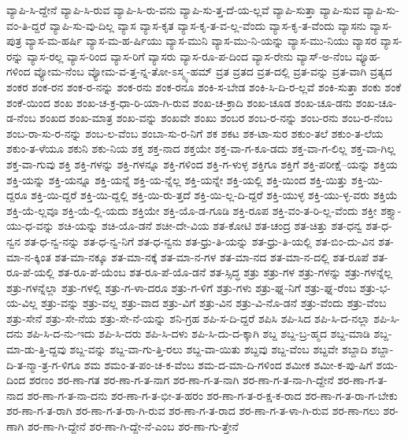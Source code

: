 {ವ್ಯಾಪಿ-ಸಿ-ದ್ದೇನೆ
ವ್ಯಾಪಿ-ಸಿ-ರುವ
ವ್ಯಾಪಿ-ಸಿ-ರು-ವನು
ವ್ಯಾಪಿ-ಸು-ತ್ತ-ದೆ-ಯ-ಲ್ಲವೆ
ವ್ಯಾಪಿ-ಸುತ್ತಾ
ವ್ಯಾಪಿ-ಸುವ
ವ್ಯಾಪಿ-ಸು-ವಂ-ತಿ-ದ್ದರೆ
ವ್ಯಾಪಿ-ಸು-ವು-ದಿಲ್ಲ
ವ್ಯಾಸ
ವ್ಯಾಸ-ಕೃತ
ವ್ಯಾಸ-ಕೃ-ತ-ವ-ಲ್ಲ-ವೆಂದು
ವ್ಯಾಸ-ಕೃ-ತ-ವೆಂದು
ವ್ಯಾಸನು
ವ್ಯಾಸ-ಪುತ್ರ
ವ್ಯಾಸ-ಮ-ಹರ್ಷಿ
ವ್ಯಾಸ-ಮ-ಹ-ರ್ಷಿಯು
ವ್ಯಾಸ-ಮುನಿ
ವ್ಯಾಸ-ಮು-ನಿ-ಯನ್ನು
ವ್ಯಾಸ-ಮು-ನಿಯು
ವ್ಯಾಸರ
ವ್ಯಾಸ-ರನ್ನು
ವ್ಯಾಸ-ರಲ್ಲ
ವ್ಯಾಸ-ರಿಂದ
ವ್ಯಾಸ-ರಿಗೆ
ವ್ಯಾಸರು
ವ್ಯಾಸ-ರೂ-ಪ-ದಿಂದ
ವ್ಯಾಸ-ರೇನು
ವ್ಯಾಸ್-ಅ-ನೆಂಬ
ವ್ಯೂಹ-ಗಳಿಂದ
ವ್ಯೋಮ-ನೆಂಬ
ವ್ಯೋಮ-ವ-ತ್ತ-ನ್ನ-ತೋ-ಽಸ್ಮ್ಯ-ಹಮ್
ವ್ರತ
ವ್ರತದ
ವ್ರತ-ದಲ್ಲಿ
ವ್ರತ-ವನ್ನು
ವ್ರತ-ವಾಗಿ
ವ್ರತ್ಯದ
ಶಂಕರ
ಶಂಕ-ರನ
ಶಂಕ-ರ-ನನ್ನು
ಶಂಕ-ರನು
ಶಂಕ-ರನೂ
ಶಂಕಿ-ಸ-ಬೇಡ
ಶಂಕಿ-ಸಿ-ದಿ-ರ-ಲ್ಲವೆ
ಶಂಕಿ-ಸುತ್ತಾ
ಶಂಕು
ಶಂಕೆ
ಶಂಕೆ-ಯಿಂದ
ಶಂಖ
ಶಂಖ-ಚ-ಕ್ರ-ಧಾ-ರಿ-ಯಾ-ಗಿ-ರುವ
ಶಂಖ-ಚ-ಕ್ರಾದಿ
ಶಂಖ-ಚೂಡ
ಶಂಖ-ಚೂ-ಡನು
ಶಂಖ-ಚೂ-ಡ-ನೆಂಬ
ಶಂಖದ
ಶಂಖ-ಮಾತ್ರ
ಶಂಖ-ವನ್ನು
ಶಂಖವೇ
ಶಂಖು
ಶಂಬರ
ಶಂಬ-ರ-ನನ್ನು
ಶಂಬ-ರನು
ಶಂಬ-ರ-ನೆಂಬ
ಶಂಬ-ರಾ-ಸು-ರ-ನನ್ನು
ಶಂಬ-ಲ-ವೆಂಬ
ಶಂಬಾ-ಸು-ರ-ನಿಗೆ
ಶಕ
ಶಕಟ
ಶಕ-ಟಾ-ಸುರ
ಶಕುಂ-ತಲೆ
ಶಕುಂ-ತ-ಲೆಯ
ಶಕುಂ-ತ-ಳೆಯೂ
ಶಕುನಿ
ಶಕು-ನಿಯ
ಶಕ್ತ
ಶಕ್ತ-ನಾದ
ಶಕ್ತಯೇ
ಶಕ್ತ-ವಾ-ಗ-ಕೂ-ಡದು
ಶಕ್ತ-ವಾ-ಗ-ಲಿಲ್ಲ
ಶಕ್ತ-ವಾ-ಗಿಲ್ಲ
ಶಕ್ತ-ವಾ-ಗುವು
ಶಕ್ತಿ
ಶಕ್ತಿ-ಗಳನ್ನು
ಶಕ್ತಿ-ಗಳನ್ನೂ
ಶಕ್ತಿ-ಗಳಿಂದ
ಶಕ್ತಿ-ಗ-ಳುಳ್ಳ
ಶಕ್ತಿಗೂ
ಶಕ್ತಿಗೆ
ಶಕ್ತಿ-ಪರೀಕ್ಷೆ--ಯನ್ನು
ಶಕ್ತಿಯ
ಶಕ್ತಿ-ಯನ್ನು
ಶಕ್ತಿ-ಯನ್ನೂ
ಶಕ್ತಿ-ಯನ್ನೆ
ಶಕ್ತಿ-ಯ-ನ್ನೆಲ್ಲ
ಶಕ್ತಿ-ಯನ್ನೇ
ಶಕ್ತಿ-ಯಲ್ಲಿ
ಶಕ್ತಿ-ಯಿಂದ
ಶಕ್ತಿ-ಯಿತ್ತು
ಶಕ್ತಿ-ಯಿ-ದ್ದರೂ
ಶಕ್ತಿ-ಯಿ-ದ್ದರೆ
ಶಕ್ತಿ-ಯಿ-ದ್ದಲ್ಲಿ
ಶಕ್ತಿ-ಯಿ-ರು-ತ್ತದೆ
ಶಕ್ತಿ-ಯಿ-ಲ್ಲ-ದಿ-ದ್ದರೆ
ಶಕ್ತಿ-ಯುಳ್ಳ
ಶಕ್ತಿ-ಯು-ಳ್ಳ-ವರು
ಶಕ್ತಿಯೆ
ಶಕ್ತಿ-ಯೆ-ಲ್ಲವೂ
ಶಕ್ತಿ-ಯೆ-ಲ್ಲಿ-ಯದು
ಶಕ್ತಿಯೇ
ಶಕ್ತಿ-ಯೊ-ಡ-ಗೂಡಿ
ಶಕ್ತಿ-ರೂಪ
ಶಕ್ತಿ-ವಂ-ತ-ರಿ-ಲ್ಲ-ವೆಂದು
ಶಕ್ತೀ
ಶಕ್ತ್ಯಾ-ಯು-ಧ-ವನ್ನು
ಶಚಿ-ಯನ್ನು
ಶಚಿ-ಯೊ-ಡನೆ
ಶಚೀ-ದೇ-ವಿಯ
ಶತ-ಕೋಟಿ
ಶತ-ಚಂದ್ರ
ಶತ-ಚಿತ್ತು
ಶತ-ಧನ್ವ
ಶತ-ಧ-ನ್ವನ
ಶತ-ಧ-ನ್ವ-ನನ್ನು
ಶತ-ಧ-ನ್ವ-ನಿಗೆ
ಶತ-ಧ-ನ್ವನು
ಶತ-ಧ್ರು-ತಿ-ಯನ್ನು
ಶತ-ಧ್ರು-ತಿ-ಯಲ್ಲಿ
ಶತ-ಬಿಂ-ದು-ವಿನ
ಶತ-ಮಾ-ನ-ಕ್ಕಿಂತ
ಶತ-ಮಾ-ನಕ್ಕೂ
ಶತ-ಮಾ-ನಕ್ಕೆ
ಶತ-ಮಾ-ನ-ಗಳ
ಶತ-ಮಾ-ನದ
ಶತ-ಮಾ-ನ-ದಲ್ಲಿ
ಶತ-ರೂಪೆ
ಶತ-ರೂ-ಪೆ-ಯಲ್ಲಿ
ಶತ-ರೂ-ಪೆ-ಯೆಂಬ
ಶತ-ರೂ-ಪೆ-ಯೊ-ಡನೆ
ಶತ-ಸ್ಸಿದ್ಧ
ಶತ್ರು
ಶತ್ರು-ಗಳ
ಶತ್ರು-ಗಳನ್ನು
ಶತ್ರು-ಗಳನ್ನೆಲ್ಲ
ಶತ್ರು-ಗಳನ್ನೆಲ್ಲಾ
ಶತ್ರು-ಗಳಲ್ಲಿ
ಶತ್ರು-ಗ-ಳಾ-ದರೂ
ಶತ್ರು-ಗ-ಳಿಗೆ
ಶತ್ರು-ಗಳು
ಶತ್ರು-ಘ್ನ-ನಿಗೆ
ಶತ್ರು-ಘ್ನ-ರೆಂಬ
ಶತ್ರು-ಭ-ಯ-ವಿಲ್ಲ
ಶತ್ರು-ವನ್ನು
ಶತ್ರು-ವಲ್ಲ
ಶತ್ರು-ವಾದ
ಶತ್ರು-ವಿಗೆ
ಶತ್ರು-ವಿನ
ಶತ್ರು-ವಿ-ನೊ-ಡನೆ
ಶತ್ರು-ವೆಂದು
ಶತ್ರು-ವೆಂಬ
ಶತ್ರು-ಸೇನೆ
ಶತ್ರು-ಸೇ-ನೆಯ
ಶತ್ರು-ಸೇ-ನೆ-ಯನ್ನು
ಶನಿ-ಗ್ರಹ
ಶಪಿ-ಸ-ದಿ-ದ್ದರೆ
ಶಪಿಸಿ
ಶಪಿ-ಸಿದ
ಶಪಿ-ಸಿ-ದ-ನಲ್ಲಾ
ಶಪಿ-ಸಿ-ದನು
ಶಪಿ-ಸಿ-ದ-ನು-ಇದು
ಶಪಿ-ಸಿ-ದರು
ಶಪಿ-ಸಿ-ದಳು
ಶಪಿ-ಸಿ-ದು-ದ-ಕ್ಕಾಗಿ
ಶಬ್ದ
ಶಬ್ದ-ಬ್ರ-ಹ್ಮದ
ಶಬ್ದ-ಮಾಡಿ
ಶಬ್ದ-ಮಾ-ಡು-ತ್ತಿ-ದ್ದವು
ಶಬ್ದ-ವನ್ನು
ಶಬ್ದ-ವಾ-ಗು-ತ್ತಿ-ರಲು
ಶಬ್ದ-ವಾ-ಯಿತು
ಶಬ್ದವು
ಶಬ್ದ-ವೆಂಬ
ಶಬ್ದವೇ
ಶಬ್ದಾದಿ
ಶಬ್ದಾ-ದಿ-ತ-ನ್ಮಾ-ತ್ರ-ಗ-ಳಿಗೂ
ಶಮ
ಶಮಂ-ತ-ಪಂ-ಚ-ಕ-ವೆಂಬ
ಶಮ-ದ-ಮಾ-ದಿ-ಗಳಿಂದ
ಶಮೀಕ
ಶಮೀ-ಕ-ಪು-ಷಿಗೆ
ಶಯ-ದಿಂದ
ಶರಣಂ
ಶರ-ಣಾ-ಗತ
ಶರ-ಣಾ-ಗ-ತ-ನಾಗ
ಶರ-ಣಾ-ಗ-ತ-ನಾಗಿ
ಶರ-ಣಾ-ಗ-ತ-ನಾ-ಗಿ-ದ್ದೇನೆ
ಶರ-ಣಾ-ಗ-ತ-ನಾದ
ಶರ-ಣಾ-ಗ-ತ-ನಾ-ದನು
ಶರ-ಣಾ-ಗ-ತ-ಭೀ-ತ-ಹರಂ
ಶರ-ಣಾ-ಗ-ತ-ರ-ಕ್ಷ-ಕ-ರಾದ
ಶರ-ಣಾ-ಗ-ತ-ರಾ-ಗ-ಬೇಕು
ಶರ-ಣಾ-ಗ-ತ-ರಾಗಿ
ಶರ-ಣಾ-ಗ-ತ-ರಾ-ಗಿ-ರುವ
ಶರ-ಣಾ-ಗ-ತ-ರಾದ
ಶರ-ಣಾ-ಗ-ತ-ಳಾ-ಗಿ-ರುವ
ಶರ-ಣಾ-ಗಲು
ಶರ-ಣಾಗಿ
ಶರ-ಣಾ-ಗಿ-ದ್ದೇನೆ
ಶರ-ಣಾ-ಗಿ-ದ್ದೇ-ನೆ-ಎಂಬ
ಶರ-ಣಾ-ಗು-ತ್ತೇನೆ
}
